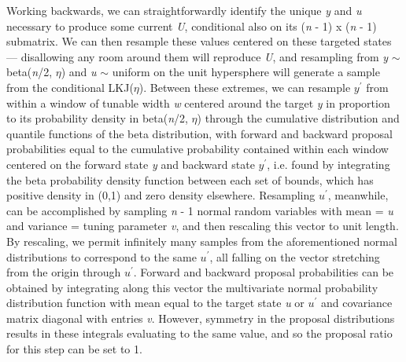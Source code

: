 \documentclass[10pt]{article}
\begin{document}
Working backwards, we can straightforwardly identify the unique \textit{y} and \textit{u} necessary to produce some current \textit{U}, conditional also on its (\textit{n} - 1) x (\textit{n} - 1) submatrix. We can then resample these values centered on these targeted states --- disallowing any room around them will reproduce \textit{U}, and resampling from \textit{y} $\sim$ beta(\textit{n}/2, $\eta$) and \textit{u} $\sim$ uniform on the unit hypersphere will generate a sample from the conditional LKJ($\eta$). Between these extremes, we can resample \textit{$y^\prime$} from within a window of tunable width \textit{w} centered around the target \textit{y} in proportion to its probability density in beta(\textit{n}/2, $\eta$) through the cumulative distribution and quantile functions of the beta distribution, with forward and backward proposal probabilities equal to the cumulative probability contained within each window centered on the forward state \textit{y} and backward state \textit{$y^\prime$}, i.e. found by integrating the beta probability density function between each set of bounds, which has positive density in (0,1) and zero density elsewhere. Resampling \textit{$u^\prime$}, meanwhile, can be accomplished by sampling \textit{n} - 1 normal random variables with mean = \textit{u} and variance = tuning parameter \textit{v}, and then rescaling this vector to unit length. By rescaling, we permit infinitely many samples from the aforementioned normal distributions to correspond to the same \textit{$u^\prime$}, all falling on the vector stretching from the origin through \textit{$u^\prime$}. Forward and backward proposal probabilities can be obtained by integrating along this vector the multivariate normal probability distribution function with mean equal to the target state \textit{u} or \textit{$u^\prime$} and covariance matrix diagonal with entries \textit{v}. However, symmetry in the proposal distributions results in these integrals evaluating to the same value, and so the proposal ratio for this step can be set to 1.
\end{document}
